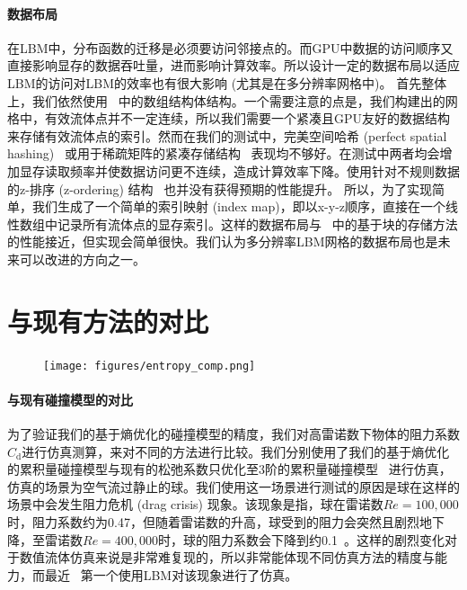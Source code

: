 \paragraph{数据布局}
在LBM中，分布函数的迁移是必须要访问邻接点的。而GPU中数据的访问顺序又直接影响显存的数据吞吐量，进而影响计算效率。所以设计一定的数据布局以适应LBM的访问对LBM的效率也有很大影响 (尤其是在多分辨率网格中)。
首先整体上，我们依然使用~\cite{Chen-2021} 中的数组结构体结构。一个需要注意的点是，我们构建出的网格中，有效流体点并不一定连续，所以我们需要一个紧凑且GPU友好的数据结构来存储有效流体点的索引。然而在我们的测试中，完美空间哈希 (perfect spatial hashing)~\cite{Lefebvre-2006} 或用于稀疏矩阵的紧凑存储结构~\cite{Greathouse-2014} 表现均不够好。在测试中两者均会增加显存读取频率并使数据访问更不连续，造成计算效率下降。使用针对不规则数据的z-排序 (z-ordering) 结构~\cite{Chen-2021} 也并没有获得预期的性能提升。
所以，为了实现简单，我们生成了一个简单的索引映射 (index map)，即以x-y-z顺序，直接在一个线性数组中记录所有流体点的显存索引。这样的数据布局与~\cite{Chen-2021} 中的基于块的存储方法的性能接近，但实现会简单很快。我们认为多分辨率LBM网格的数据布局也是未来可以改进的方向之一。

\section{与现有方法的对比}
\begin{figure}[htb]
  \centering
    \texttt{[image: figures/entropy\_comp.png]}
  \label{img:entropy_comp}
  \end{figure}

\paragraph{与现有碰撞模型的对比}
为了验证我们的基于熵优化的碰撞模型的精度，我们对高雷诺数下物体的阻力系数$C_\text{d}$进行仿真测算，来对不同的方法进行比较。我们分别使用了我们的基于熵优化的累积量碰撞模型与现有的松弛系数只优化至3阶的累积量碰撞模型~\cite{Geier-2017} 进行仿真，仿真的场景为空气流过静止的球。我们使用这一场景进行测试的原因是球在这样的场景中会发生阻力危机 (drag crisis) 现象。该现象是指，球在雷诺数$Re=100,000$时，阻力系数约为0.47，但随着雷诺数的升高，球受到的阻力会突然且剧烈地下降，至雷诺数$Re=400,000$时，球的阻力系数会下降到约0.1~\cite{Tiwari-2020}。这样的剧烈变化对于数值流体仿真来说是非常难复现的，所以非常能体现不同仿真方法的精度与能力，而最近~\cite{Geier-2017-b} 第一个使用LBM对该现象进行了仿真。

